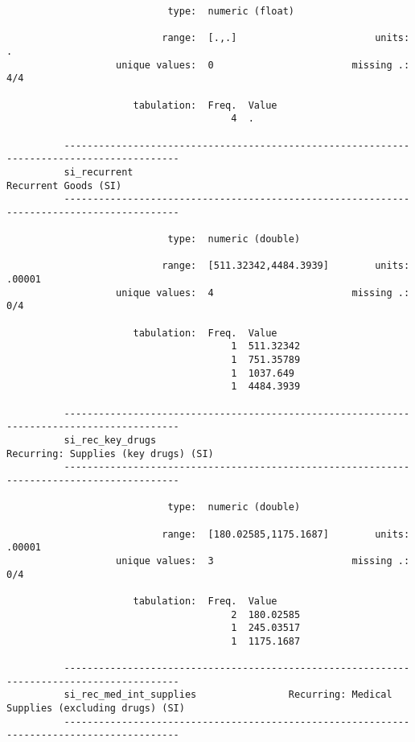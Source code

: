 \documentclass{article}
\begin{document}
\begin{verbatim}
                            type:  numeric (float)
          
                           range:  [.,.]                        units:  .
                   unique values:  0                        missing .:  4/4
          
                      tabulation:  Freq.  Value
                                       4  .
          
          ------------------------------------------------------------------------------------------
          si_recurrent                                                          Recurrent Goods (SI)
          ------------------------------------------------------------------------------------------
          
                            type:  numeric (double)
          
                           range:  [511.32342,4484.3939]        units:  .00001
                   unique values:  4                        missing .:  0/4
          
                      tabulation:  Freq.  Value
                                       1  511.32342
                                       1  751.35789
                                       1  1037.649
                                       1  4484.3939
          
          ------------------------------------------------------------------------------------------
          si_rec_key_drugs                                      Recurring: Supplies (key drugs) (SI)
          ------------------------------------------------------------------------------------------
          
                            type:  numeric (double)
          
                           range:  [180.02585,1175.1687]        units:  .00001
                   unique values:  3                        missing .:  0/4
          
                      tabulation:  Freq.  Value
                                       2  180.02585
                                       1  245.03517
                                       1  1175.1687
          
          ------------------------------------------------------------------------------------------
          si_rec_med_int_supplies                Recurring: Medical Supplies (excluding drugs) (SI)
          ------------------------------------------------------------------------------------------
          

\end{verbatim}
\end{document}
